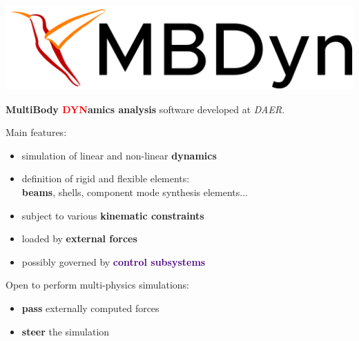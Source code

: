 \documentclass[10pt,t]{beamer}
\begin{document}
\begin{frame}{\includegraphics[width=.18\textwidth]{images/mbdyn.png}}

\textbf{\textcolor{dorange}{M}ulti\textcolor{dorange}{B}ody \textcolor{red}{DYN}amics analysis} software developed at \textit{DAER}.\\


\vspace{5mm}

Main features:

    \begin{itemize}
        \item simulation of linear and non-linear \textbf{\textcolor{dorange}{dynamics}}
        \item definition of rigid and flexible elements:\\ \textbf{\textcolor{dblue}{beams}}, shells, component mode synthesis elements...
        \item subject to various \textbf{\textcolor{pblue}{kinematic constraints}}
        \item loaded by \textbf{\textcolor{fgreen}{external forces}}
        \item possibly governed by \textbf{\textcolor{indigo}{control subsystems}}
    \end{itemize}

\pause
\vspace{5mm}

Open to perform multi-physics simulations:
\begin{itemize}
    \item \textbf{pass} externally computed forces
    \item \textbf{steer} the simulation
\end{itemize}

\end{frame}
\end{document}
